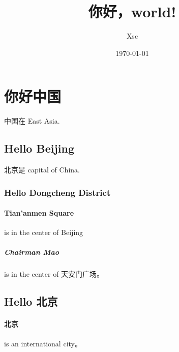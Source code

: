 \documentclass[UTF8]{ctexart}
\title{你好，world!}
\author{Xsc}
\date{\today}
\begin{document}
	\maketitle
	\tableofcontents
	\section{你好中国}
	中国在 East Asia.
	\subsection{Hello Beijing}
	北京是 capital of China.
	\subsubsection{Hello Dongcheng District}
	\paragraph{Tian'anmen Square}
	is in the center of Beijing
	\subparagraph{Chairman Mao}
	is in the center of 天安门广场。
	\subsection{Hello 北京}
	\paragraph{北京} is an international city。
\end{document}
